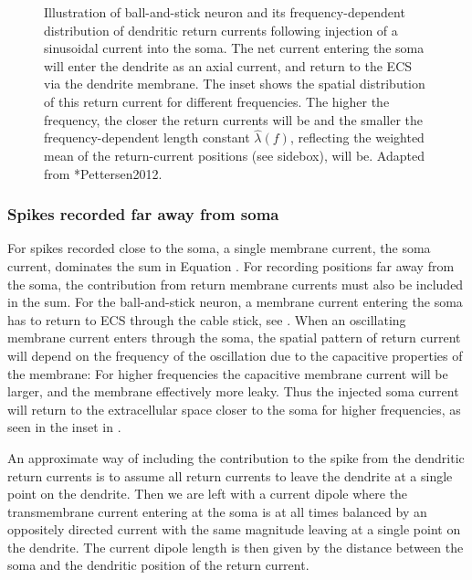 \begin{figure}[!ht]
\begin{center}
\end{center}
\caption[]{Illustration of ball-and-stick neuron and its frequency-dependent 
distribution of dendritic return currents following injection of a sinusoidal current into the soma.
The net current entering the soma will enter the dendrite as an axial current, and return to the 
ECS via the dendrite membrane. The inset shows the spatial distribution of this return current
for different frequencies. The higher the frequency, the closer the return currents will be and
the smaller the frequency-dependent length constant $\hat{\lambda}(f)$, reflecting the weighted mean 
of the return-current positions (see sidebox), will be. 
 Adapted from \citeasnoun**{Pettersen2012}.
}
\label{fig:Spikes:ball-and-stick-sketch}
\end{figure}
%


\subsubsection{Spikes recorded far away from soma}
\label{sec:Spikes:far-spikes}

For spikes recorded close to the soma, a single membrane current, the soma current,
dominates the sum in Equation . 
For recording positions far away from the soma, the contribution from return membrane currents must also be included in the sum. For the ball-and-stick neuron, a membrane current entering the soma has to return to ECS through the cable stick, see . When an oscillating membrane current enters through the soma, the spatial pattern of return current will depend on the frequency of the oscillation due to the capacitive properties of the membrane: For higher frequencies the capacitive membrane current will be larger, and the membrane effectively more leaky. Thus the injected soma current will return to the extracellular space 
closer to the soma for higher frequencies, as  seen in the inset in .  

An approximate way of including the contribution to the spike from the dendritic return currents is to
assume all return currents to leave the dendrite at a single point on the dendrite. Then we are left with
a current dipole where the transmembrane current entering at the soma is at all times balanced by an oppositely directed current
with the same magnitude leaving at a single point on the dendrite. The current dipole length is then given by the distance
between the soma and the dendritic position of the return current. 

